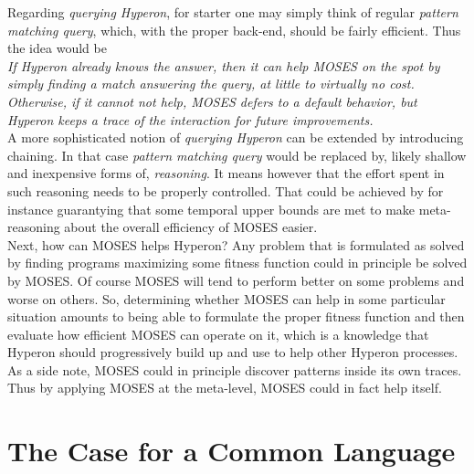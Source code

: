 \documentclass[]{report}
\begin{document}
Regarding \emph{querying Hyperon}, for starter one may simply think of
regular \emph{pattern matching query}, which, with the proper
back-end, should be fairly efficient.  Thus the idea would be\\

\emph{If Hyperon already knows the answer, then it can help MOSES on
the spot by simply finding a match answering the query, at little to
virtually no cost.  Otherwise, if it cannot not help, MOSES defers to
a default behavior, but Hyperon keeps a trace of the interaction for
future improvements.}\\

A more sophisticated notion of \emph{querying Hyperon} can be extended
by introducing chaining.  In that case \emph{pattern matching query}
would be replaced by, likely shallow and inexpensive forms of,
\emph{reasoning}.  It means however that the effort spent in such
reasoning needs to be properly controlled.  That could be achieved by
for instance guarantying that some temporal upper bounds are met to
make meta-reasoning about the overall efficiency of MOSES easier.\\

Next, how can MOSES helps Hyperon? Any problem that is formulated as
solved by finding programs maximizing some fitness function could in
principle be solved by MOSES.  Of course MOSES will tend to perform
better on some problems and worse on others.  So, determining whether
MOSES can help in some particular situation amounts to being able to
formulate the proper fitness function and then evaluate how efficient
MOSES can operate on it, which is a knowledge that Hyperon should
progressively build up and use to help other Hyperon processes.  As a
side note, MOSES could in principle discover patterns inside its own
traces.  Thus by applying MOSES at the meta-level, MOSES could in fact
help itself.

\section{The Case for a Common Language}
\end{document}
